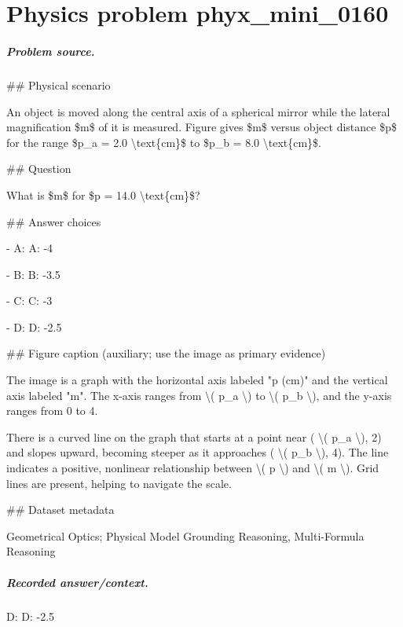 
\chapter{Physics problem phyx\_mini\_0160}
\label{ch:PhyXMiniProblems_problem_phyx_mini_0160}

\paragraph{Problem source.}
\#\# Physical scenario

An object is moved along the central axis of a spherical mirror while the lateral magnification \$m\$ of it is measured. Figure gives \$m\$ versus object distance \$p\$ for the range \$p\_a = 2.0 \textbackslash{}text\{cm\}\$ to \$p\_b = 8.0 \textbackslash{}text\{cm\}\$.

\#\# Question

What is \$m\$ for \$p = 14.0 \textbackslash{}text\{cm\}\$?

\#\# Answer choices

- A: A: -4

- B: B: -3.5

- C: C: -3

- D: D: -2.5

\#\# Figure caption (auxiliary; use the image as primary evidence)

The image is a graph with the horizontal axis labeled "p (cm)" and the vertical axis labeled "m". The x-axis ranges from \textbackslash{}( p\_a \textbackslash{}) to \textbackslash{}( p\_b \textbackslash{}), and the y-axis ranges from 0 to 4. 

There is a curved line on the graph that starts at a point near ( \textbackslash{}( p\_a \textbackslash{}), 2) and slopes upward, becoming steeper as it approaches ( \textbackslash{}( p\_b \textbackslash{}), 4). The line indicates a positive, nonlinear relationship between \textbackslash{}( p \textbackslash{}) and \textbackslash{}( m \textbackslash{}). Grid lines are present, helping to navigate the scale.

\#\# Dataset metadata

Geometrical Optics; Physical Model Grounding Reasoning, Multi-Formula Reasoning

\paragraph{Recorded answer/context.}
D: D: -2.5

